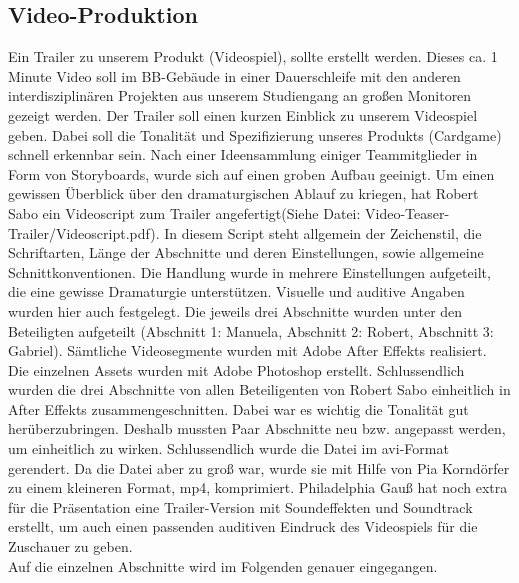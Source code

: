 \subsection{Video-Produktion}
Ein Trailer zu unserem Produkt (Videospiel), sollte erstellt werden. Dieses ca. 1 Minute Video soll im BB-Gebäude in einer Dauerschleife mit den anderen interdisziplinären Projekten aus unserem Studiengang an großen Monitoren gezeigt werden. Der Trailer soll einen kurzen Einblick zu unserem Videospiel geben. Dabei soll die Tonalität und Spezifizierung unseres Produkts (Cardgame) schnell erkennbar sein. Nach einer Ideensammlung einiger Teammitglieder in Form von Storyboards, wurde sich auf einen groben Aufbau geeinigt.
Um einen gewissen Überblick über den dramaturgischen Ablauf zu kriegen, hat Robert Sabo ein Videoscript zum Trailer angefertigt(Siehe Datei: Video-Teaser-Trailer/Videoscript.pdf). In diesem Script steht allgemein der Zeichenstil, die Schriftarten, Länge der Abschnitte und deren Einstellungen, sowie allgemeine Schnittkonventionen. Die Handlung wurde in mehrere Einstellungen aufgeteilt, die eine gewisse Dramaturgie unterstützen. Visuelle und auditive Angaben wurden hier auch festgelegt. Die jeweils drei Abschnitte wurden unter den Beteiligten aufgeteilt (Abschnitt 1: Manuela, Abschnitt 2: Robert, Abschnitt 3: Gabriel). Sämtliche Videosegmente wurden mit Adobe After Effekts realisiert. Die einzelnen Assets wurden mit Adobe Photoshop erstellt. Schlussendlich wurden die drei Abschnitte von allen Beteiligenten von Robert Sabo einheitlich in After Effekts zusammengeschnitten. Dabei war es wichtig die Tonalität gut herüberzubringen. Deshalb mussten Paar Abschnitte neu bzw. angepasst werden, um einheitlich zu wirken. Schlussendlich wurde die Datei im avi-Format gerendert. Da die Datei aber zu groß war, wurde sie mit Hilfe von Pia Korndörfer zu einem kleineren Format, mp4, komprimiert. Philadelphia Gauß hat noch extra für die Präsentation eine Trailer-Version mit Soundeffekten und Soundtrack erstellt, um auch einen passenden auditiven Eindruck des Videospiels für die Zuschauer zu geben.\\
Auf die einzelnen Abschnitte wird im Folgenden genauer eingegangen.

